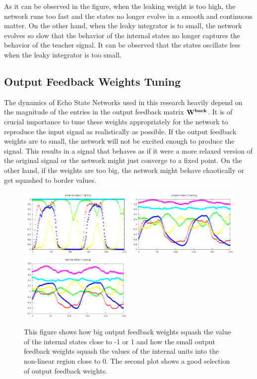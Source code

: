 \documentclass[letterpaper,9pt]{article}
\begin{document}
As it can be observed in the figure, when the leaking weight is too high, the network runs too fast and the states no longer evolve in a smooth and continuous matter. On the other hand, when the leaky integrator is to small, the network evolves so slow that the behavior of the internal states no longer captures the behavior of the teacher signal. It can be observed that the states oscillate less when the leaky integrator is too small. 

\subsection{Output Feedback Weights Tuning}

The dynamics of Echo State Networks used in this research heavily depend on the magnitude of the entries in the output feedback matrix ${\bf W^{back}}$. It is of crucial importance to tune these weights appropriately for the network to reproduce the input signal as realistically as possible. If the output feedback weights are to small, the network will not be excited enough to produce the signal. This results in a signal that behaves as if it were a more relaxed version of the original signal or the network might just converge to a fixed point. On the other hand, if the weights are too big, the network might behave chaotically or get squashed to border values.

\begin{figure}[h!]
  \centering
  \includegraphics[height=125px]{Extra/ofbw_big.png}
  \includegraphics[height=125px]{Extra/ofbw_ok.png}
  \includegraphics[height=125px]{Extra/ofbw_small.png}
    \caption[Output Feedback Weights Comparison]{This figure shows how big output feedback weights squash the value of the internal states close to -1 or 1 and how the small output feedback weights squash the values of the internal units into the non-linear region close to 0. The second plot shows a good selection of output feedback weights.}
\end{figure}
\end{document}
